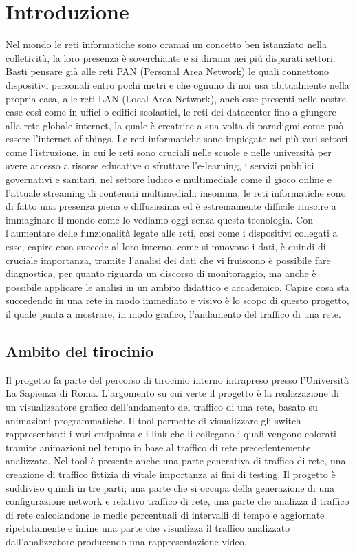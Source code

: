 \documentclass[binding=0.6cm]{sapthesis}
\begin{document}
\chapter{Introduzione}
Nel mondo le reti informatiche sono oramai un concetto ben istanziato 
nella colletività, la loro presenza è soverchiante e si dirama nei più disparati settori.
Basti pensare già alle  reti PAN (Personal Area Network) le quali connettono dispositivi
personali entro pochi metri e che ognuno di noi usa abitualmente nella propria casa, 
alle reti LAN (Local Area Network), 
anch'esse presenti
nelle nostre case così come in uffici o edifici scolastici, le reti dei datacenter 
fino a giungere alla rete globale internet, la quale è creatrice a sua volta di paradigmi come
può essere l'internet of things. Le reti informatiche sono impiegate nei più vari 
settori come l'istruzione, in cui le reti
sono cruciali nelle scuole e nelle università per avere accesso a risorse educative o sfruttare l'e-learning, i servizi
pubblici governativi e sanitari, nel settore ludico e multimediale come il gioco online e l'attuale
streaming di contenuti multimediali: insomma, le reti informatiche sono di fatto una presenza piena e diffusissima
ed è estremamente difficile riuscire a immaginare il mondo come lo vediamo oggi senza questa tecnologia.
Con l'aumentare delle funzionalità legate alle reti, così come i dispositivi collegati a esse, capire cosa succede al
loro interno, come si muovono i dati, è quindi di cruciale importanza, tramite l'analisi dei dati che vi fruiscono è possibile fare diagnostica, per quanto
riguarda un discorso di monitoraggio, ma anche è possibile applicare le analisi in un ambito didattico e accademico.
Capire cosa sta succedendo in una rete in modo immediato e visivo è lo scopo di questo progetto, il quale punta a mostrare,
in modo grafico, l'andamento del traffico di una rete.
\section{Ambito del tirocinio}
Il progetto fa parte del percorso di tirocinio interno intrapreso presso l'Università La Sapienza di Roma. L'argomento su cui verte il progetto
è la realizzazione di un visualizzatore grafico dell'andamento del traffico di una rete, basato
su animazioni programmatiche. Il tool permette di visualizzare gli switch rappresentanti 
i vari endpoints e i link
che li collegano i quali vengono colorati tramite animazioni nel tempo in base al traffico di 
rete precedentemente analizzato. Nel tool è presente anche una parte generativa di traffico di rete,
una creazione di traffico fittizia di vitale importanza ai fini di testing. Il progetto è suddiviso quindi in tre parti; una parte
che si occupa della generazione di una configurazione network e relativo traffico di rete, 
una parte che analizza il traffico di rete
calcolandone le medie percentuali di intervalli di tempo e aggiornate ripetutamente e infine 
una parte che visualizza il traffico analizzato
dall'analizzatore producendo una rappresentazione video.
\end{document}
